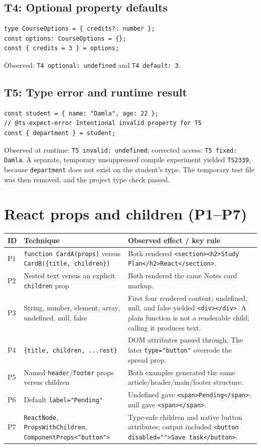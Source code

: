 \documentclass[11pt,a4paper]{article}
\begin{document}
\subsection{T4: Optional property defaults}
\begin{lstlisting}
type CourseOptions = { credits?: number };
const options: CourseOptions = {};
const { credits = 3 } = options;
\end{lstlisting}
Observed: \texttt{T4 optional: undefined} and \texttt{T4 default: 3}.
\subsection{T5: Type error and runtime result}
\begin{lstlisting}
const student = { name: "Damla", age: 22 };
// @ts-expect-error Intentional invalid property for T5
const { department } = student;
\end{lstlisting}
Observed at runtime: \texttt{T5 invalid: undefined}; corrected access: \texttt{T5 fixed: Damla}. A separate, temporary unsuppressed compile experiment yielded \texttt{TS2339}, because \texttt{department} does not exist on the student's type. The temporary test file was then removed, and the project type check passed.
\section{React props and children (P1--P7)}
\begin{longtable}{@{}p{.09\linewidth}p{.43\linewidth}p{.39\linewidth}@{}}
\toprule ID & Technique & Observed effect / key rule \\\midrule\endhead
P1 & \texttt{function CardA(props)} versus \texttt{CardB(\{title, children\})} & Both rendered \texttt{<section><h2>Study Plan</h2>React</section>}.\\
P2 & Nested text versus an explicit \texttt{children} prop & Both rendered the same Notes card markup.\\
P3 & String, number, element, array, undefined, null, false & First four rendered content; undefined, null, and false yielded \texttt{<div></div>}. A plain function is not a renderable child; calling it produces text.\\
P4 & \texttt{\{title, children, ...rest\}} & DOM attributes passed through. The later \texttt{type="button"} overrode the spread prop.\\
P5 & Named \texttt{header}/\texttt{footer} props versus children & Both examples generated the same article/header/main/footer structure.\\
P6 & Default \texttt{label="Pending"} & Undefined gave \texttt{<span>Pending</span>}; null gave \texttt{<span></span>}.\\
P7 & \texttt{ReactNode}, \texttt{PropsWithChildren}, \texttt{ComponentProps<"button">} & Type-safe children and native button attributes; output included \texttt{<button disabled="">Save task</button>}.\\
\bottomrule
\end{longtable}
\end{document}
